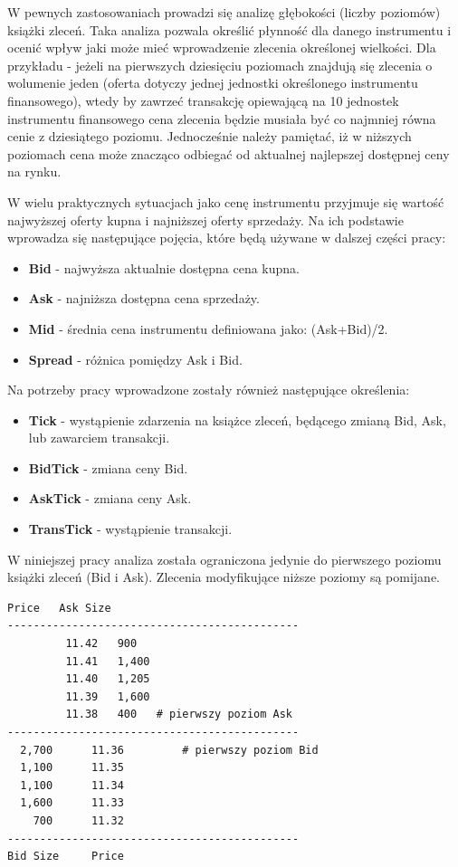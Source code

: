\documentclass[a4paper,12pt,openany, DIV=calc, headsepline]{scrbook}
\begin{document}
W pewnych zastosowaniach prowadzi się analizę głębokości (liczby poziomów) książki zleceń. Taka analiza pozwala określić płynność dla danego instrumentu i ocenić wpływ jaki może mieć wprowadzenie zlecenia określonej wielkości. Dla przykładu - jeżeli na pierwszych dziesięciu poziomach znajdują się zlecenia o wolumenie jeden (oferta dotyczy jednej jednostki określonego instrumentu finansowego), wtedy by zawrzeć transakcję opiewającą na 10 jednostek instrumentu finansowego cena zlecenia będzie musiała być co najmniej równa cenie z dziesiątego poziomu. Jednocześnie należy pamiętać, iż w niższych poziomach cena może znacząco odbiegać od aktualnej najlepszej dostępnej ceny na rynku.

W wielu praktycznych sytuacjach jako cenę instrumentu przyjmuje się wartość najwyższej oferty kupna i najniższej oferty sprzedaży. Na ich podstawie wprowadza się następujące pojęcia, które będą używane w dalszej części pracy:

\begin{itemize}
\item \textbf{Bid} - najwyższa aktualnie dostępna cena kupna.
\item \textbf{Ask} - najniższa dostępna cena sprzedaży.
\item \textbf{Mid} - średnia cena instrumentu definiowana jako: (Ask+Bid)/2.
\item \textbf{Spread} - różnica pomiędzy Ask i Bid.
\end{itemize}

Na potrzeby pracy wprowadzone zostały również następujące określenia:
\begin{itemize}
\item \textbf{Tick} - wystąpienie zdarzenia na książce zleceń, będącego zmianą Bid, Ask, lub zawarciem transakcji.
\item \textbf{BidTick} - zmiana ceny Bid.
\item \textbf{AskTick} - zmiana ceny Ask.
\item \textbf{TransTick} - wystąpienie transakcji.
\end{itemize}

W niniejszej pracy analiza została ograniczona jedynie do pierwszego poziomu książki zleceń (Bid i Ask). Zlecenia modyfikujące niższe poziomy są pomijane.

\begin{lstlisting}[float, caption = {Przykład książki zleceń. Opracowano na podstawie pakietu \emph{orderbook} (\citep{orderbookR}) środowiska R}, label={lst:exOb}]
		 Price 	 Ask Size
---------------------------------------------
		 11.42 	 900   
		 11.41 	 1,400 
		 11.40 	 1,205 
		 11.39 	 1,600 
		 11.38 	 400   # pierwszy poziom Ask
---------------------------------------------
  2,700 	 11.36         # pierwszy poziom Bid
  1,100 	 11.35 
  1,100 	 11.34 
  1,600 	 11.33 
    700 	 11.32 
---------------------------------------------
Bid Size 	 Price
\end{lstlisting}
\end{document}
